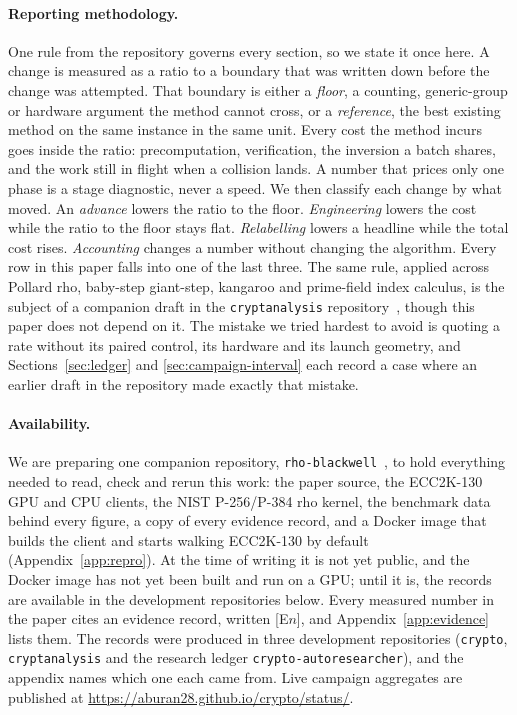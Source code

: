 \paragraph{Reporting methodology.} One rule from the repository
governs every section, so we state it once here. A change is measured
as a ratio to a boundary that was written down before the change was
attempted. That boundary is either a \emph{floor}, a counting,
generic-group or hardware argument the method cannot cross, or a
\emph{reference}, the best existing method on the same instance in the
same unit. Every cost the method incurs goes inside the ratio:
precomputation, verification, the inversion a batch shares, and the
work still in flight when a collision lands. A number that prices only
one phase is a stage diagnostic, never a speed. We then classify each
change by what moved. An \emph{advance} lowers the ratio to the floor.
\emph{Engineering} lowers the cost while the ratio to the floor stays
flat. \emph{Relabelling} lowers a headline while the total cost rises.
\emph{Accounting} changes a number without changing the algorithm.
Every row in this paper falls into one of the last three. The same
rule, applied across Pollard rho, baby-step giant-step, kangaroo and
prime-field index calculus, is the subject of a companion draft in the
\texttt{cryptanalysis} repository~\cite{ecdlppaper}, though this paper does not depend
on it. The mistake we tried hardest to avoid is quoting a rate without
its paired control, its hardware and its launch geometry, and
Sections~\ref{sec:ledger} and \ref{sec:campaign-interval} each record
a case where an earlier draft in the repository made exactly that
mistake.

\paragraph{Availability.} We are preparing one companion repository,
\texttt{rho-blackwell}~\cite{rhoblackwell}, to hold everything needed to
read, check and rerun this work: the paper source, the ECC2K-130 GPU and
CPU clients, the NIST P-256/P-384 rho kernel, the benchmark data behind
every figure, a copy of every evidence record, and a Docker image that
builds the client and starts walking ECC2K-130 by default
(Appendix~\ref{app:repro}). At the time of writing it is not yet public,
and the Docker image has not yet been built and run on a GPU; until it is,
the records are available in the development repositories below. Every
measured number in the paper cites an evidence record, written [E$n$], and
Appendix~\ref{app:evidence} lists them. The records were produced in three development repositories
(\texttt{crypto}, \texttt{cryptanalysis} and the research ledger
\texttt{crypto-autoresearcher}), and the appendix names which one each
came from. Live campaign aggregates are published at
\url{https://aburan28.github.io/crypto/status/}.

